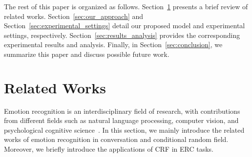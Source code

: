 \documentclass{SCIS2019}
\begin{document}
The rest of this paper is organized as follows. Section~\ref{sec:related_work} presents a brief review of related works. Section~\ref{sec:our_approach} and Section~\ref{sec:experimental_settings} detail our proposed model and experimental settings, respectively. Section~\ref{sec:results_analysis} provides the corresponding experimental results and analysis. Finally, in Section~\ref{sec:conclusion}, we summarize this paper and discuss possible future work.


\section{Related Works}\label{sec:related_work}
Emotion recognition is an interdisciplinary field of research, with contributions from different fields such as natural language processing, computer vision, and psychological cognitive science~\cite{picard2010affective}. In this section, we mainly introduce the related works of emotion recognition in conversation and conditional random field. Moreover, we briefly introduce the applications of CRF in ERC tasks.
\end{document}
